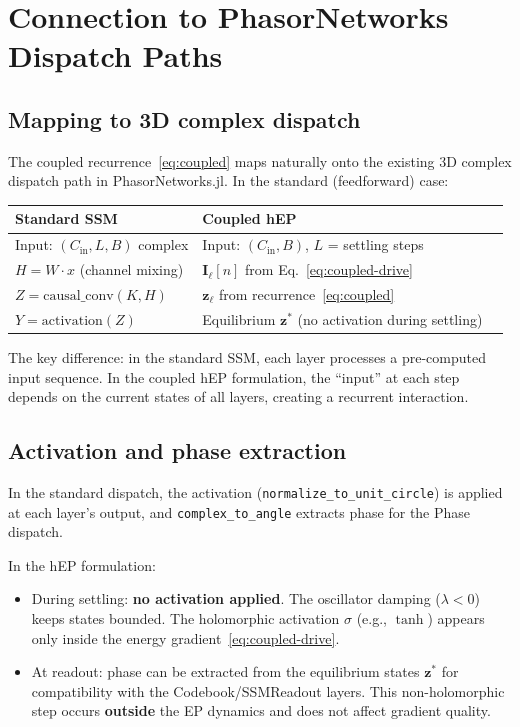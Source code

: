\documentclass[11pt]{article}
\theoremstyle{definition}
\begin{document}
\section{Connection to PhasorNetworks Dispatch Paths}\label{sec:dispatch}

\subsection{Mapping to 3D complex dispatch}

The coupled recurrence~\eqref{eq:coupled} maps naturally onto the
existing 3D complex dispatch path in PhasorNetworks.jl.  In the
standard (feedforward) case:
\begin{center}
\begin{tabular}{lll}
\toprule
\textbf{Standard SSM} & \textbf{Coupled hEP} \\
\midrule
Input: $(C_{\text{in}}, L, B)$ complex & Input: $(C_{\text{in}}, B)$,
  $L$ = settling steps \\
$H = W \cdot x$ (channel mixing) & $\bm{I}_\ell[n]$ from
  Eq.~\eqref{eq:coupled-drive} \\
$Z = \text{causal\_conv}(K, H)$ & $\bm{z}_\ell$ from
  recurrence~\eqref{eq:coupled} \\
$Y = \text{activation}(Z)$ & Equilibrium $\bm{z}^*$ (no activation
  during settling) \\
\bottomrule
\end{tabular}
\end{center}

The key difference: in the standard SSM, each layer processes a
pre-computed input sequence.  In the coupled hEP formulation, the
``input'' at each step depends on the current states of all layers,
creating a recurrent interaction.

\subsection{Activation and phase extraction}

In the standard dispatch, the activation
(\texttt{normalize\_to\_unit\_circle}) is applied at each layer's
output, and \texttt{complex\_to\_angle} extracts phase for the Phase
dispatch.

In the hEP formulation:
\begin{itemize}
\item During settling: \textbf{no activation applied}.  The oscillator
  damping ($\lambda<0$) keeps states bounded.  The holomorphic
  activation $\sigma$ (e.g., $\tanh$) appears only inside the energy
  gradient~\eqref{eq:coupled-drive}.
\item At readout: phase can be extracted from the equilibrium states
  $\bm{z}^*$ for compatibility with the Codebook/SSMReadout layers.
  This non-holomorphic step occurs \textbf{outside} the EP dynamics
  and does not affect gradient quality.
\end{itemize}
\end{document}

